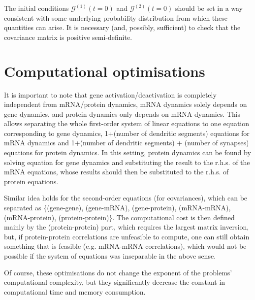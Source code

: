 \documentclass[a4paper, 11pt]{article}
\begin{document}
The initial conditions $\boldsymbol{\mathcal G}^{(1)}(t=0)$ and $\boldsymbol{\mathcal G}^{(2)}(t=0)$ should be set in a way consistent with some underlying probability distribution from which these quantities can arise. It is necessary (and, possibly, sufficient) to check that the covariance matrix is positive semi-definite. 

\appendix \label{app:Computational_optimisations}
\section{Computational optimisations}
It is important to note that gene activation/deactivation is completely independent from mRNA/protein dynamics, mRNA dynamics solely depends on gene dynamics, and protein dynamics only depends on mRNA dynamics. This allows separating the whole first-order system of linear equations to one equation corresponding to gene dynamics, 1+(number of dendritic segments) equations for mRNA dynamics and 1+(number of dendritic segments) + (number of synapses) equations for protein dynamics. In this setting, protein dynamics can be found by solving equation for gene dynamics and substituting the result to the r.h.s. of the mRNA equations, whose results should then be substituted to the r.h.s. of protein equations.

Similar idea holds for the second-order equations (for covariances), which can be separated as \{(gene-gene), (gene-mRNA), (gene-protein), (mRNA-mRNA), (mRNA-protein), (protein-protein)\}. The computational cost is then defined mainly by the (protein-protein) part, which requires the largest matrix inversion, but, if protein-protein correlations are unfeasible to compute, one can still obtain something that is feasible (e.g. mRNA-mRNA correlations), which would not be possible if the system of equations was inseparable in the above sense.

Of course, these optimisations do not change the exponent of the problems' computational complexity, but they significantly decrease the constant in computational time and memory consumption.



\end{document}
